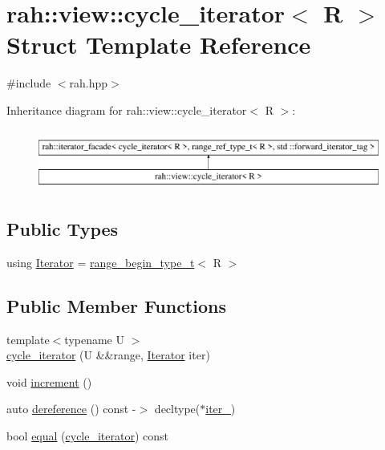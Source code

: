 \hypertarget{structrah_1_1view_1_1cycle__iterator}{}\section{rah\+::view\+::cycle\+\_\+iterator$<$ R $>$ Struct Template Reference}
\label{structrah_1_1view_1_1cycle__iterator}


{\ttfamily \#include $<$rah.\+hpp$>$}

Inheritance diagram for rah\+::view\+::cycle\+\_\+iterator$<$ R $>$\+:\begin{figure}[H]
\begin{center}
\leavevmode
\includegraphics[height=2.000000cm]{structrah_1_1view_1_1cycle__iterator}
\end{center}
\end{figure}
\subsection*{Public Types}
\begin{DoxyCompactItemize}
\item 
using \mbox{\hyperlink{structrah_1_1view_1_1cycle__iterator_ac9761016862e6bb26b0ca5e923344b83}{Iterator}} = \mbox{\hyperlink{namespacerah_a28aff4eeddcece6be65ff0b956d32d4a}{range\+\_\+begin\+\_\+type\+\_\+t}}$<$ R $>$
\end{DoxyCompactItemize}
\subsection*{Public Member Functions}
\begin{DoxyCompactItemize}
\item 
{\footnotesize template$<$typename U $>$ }\\\mbox{\hyperlink{structrah_1_1view_1_1cycle__iterator_a69b737bdbd97194bb5cfc0470fd60e58}{cycle\+\_\+iterator}} (U \&\&range, \mbox{\hyperlink{structrah_1_1view_1_1cycle__iterator_ac9761016862e6bb26b0ca5e923344b83}{Iterator}} iter)
\item 
void \mbox{\hyperlink{structrah_1_1view_1_1cycle__iterator_afa27786b512afe924d063245d7bdc3ea}{increment}} ()
\item 
auto \mbox{\hyperlink{structrah_1_1view_1_1cycle__iterator_a06349419766f9078983fa3db221a3bd8}{dereference}} () const -\/$>$ decltype($\ast$\mbox{\hyperlink{structrah_1_1view_1_1cycle__iterator_a49dea5baf32f7e9bc237b6f534513ada}{iter\+\_\+}})
\item 
bool \mbox{\hyperlink{structrah_1_1view_1_1cycle__iterator_a9e2138807dd1c35fbc202b05fa0dd933}{equal}} (\mbox{\hyperlink{structrah_1_1view_1_1cycle__iterator}{cycle\+\_\+iterator}}) const
\end{DoxyCompactItemize}
